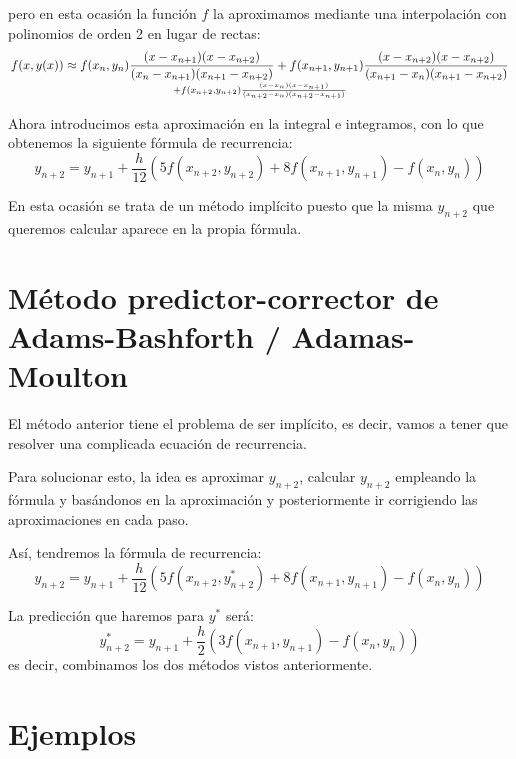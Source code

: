 \documentclass{apuntes}
\begin{document}
pero en esta ocasión la función $f$ la aproximamos mediante una interpolación con polinomios de orden 2 en lugar de rectas:
\[f(x,y(x)) \approx f(x_n,y_n) \frac{(x-x_{n+1})(x-x_{n+2})}{(x_n-x_{n+1})(x_{n+1}-x_{n+2})} + f(x_{n+1},y_{n+1})\frac{(x-x_{n+2})(x-x_{n+2})}{(x_{n+1}-x_n)(x_{n+1}-x_{n+2})} \atop+f(x_{n+2},y_{n+2})\frac{(x-x_{n})(x-x_{n+1})}{(x_{n+2}-x_n)(x_{n+2}-x_{n+1})}\]

Ahora introducimos esta aproximación en la integral e integramos, con lo que obtenemos la siguiente fórmula de recurrencia:
\[y_{n+2} = y_{n+1} + \frac{h}{12}\left( 5f(x_{n+2},y_{n+2})+8f(x_{n+1},y_{n+1})-f(x_n,y_n)\right)\]

En esta ocasión se trata de un método implícito puesto que la misma $y_{n+2}$ que queremos calcular aparece en la propia fórmula.

\section{Método predictor-corrector de Adams-Bashforth / Adamas-Moulton}

El método anterior tiene el problema de ser implícito, es decir, vamos a tener que resolver una complicada ecuación de recurrencia.

Para solucionar esto, la idea es aproximar $y_{n+2}$, calcular $y_{n+2}$ empleando la fórmula y basándonos en la aproximación y posteriormente ir corrigiendo las aproximaciones en cada paso.

Así, tendremos la fórmula de recurrencia:
\[y_{n+2} = y_{n+1} + \frac{h}{12}\left( 5f(x_{n+2},y_{n+2}^*)+8f(x_{n+1},y_{n+1})-f(x_n,y_n)\right)\]

La predicción que haremos para $y^*$ será:
\[y_{n+2}^* = y_{n+1} + \frac{h}{2} \left( 3f(x_{n+1},y_{n+1})-f(x_n,y_n)\right)\]
es decir, combinamos los dos métodos vistos anteriormente.

\section{Ejemplos}
\end{document}
